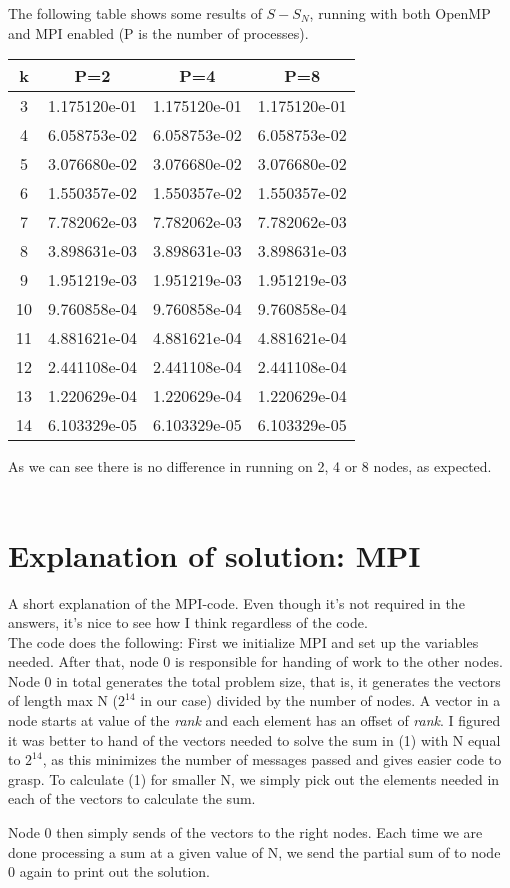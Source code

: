 \documentclass{article}
\begin{document}
The following table shows some results of $S-S_N$, running with both OpenMP and MPI enabled (P is the number of processes). \\
 
\begin{tabular} {| c || c | c | c |}
\hline
k  &  P=2           &  P=4         &   P=8 \\ \hline
3  & 1.175120e-01 & 1.175120e-01   &  1.175120e-01      \\
4  & 6.058753e-02 & 6.058753e-02   &  6.058753e-02      \\
5  & 3.076680e-02 & 3.076680e-02   &  3.076680e-02      \\ 
6  & 1.550357e-02 & 1.550357e-02   &  1.550357e-02      \\
7  & 7.782062e-03 & 7.782062e-03   &  7.782062e-03      \\
8  & 3.898631e-03 & 3.898631e-03   &  3.898631e-03      \\
9  & 1.951219e-03 & 1.951219e-03   &  1.951219e-03      \\
10 & 9.760858e-04 & 9.760858e-04   &  9.760858e-04      \\
11 & 4.881621e-04 & 4.881621e-04   &  4.881621e-04      \\
12 & 2.441108e-04 & 2.441108e-04   &  2.441108e-04      \\
13 & 1.220629e-04 & 1.220629e-04   &  1.220629e-04      \\
14 & 6.103329e-05 & 6.103329e-05   &  6.103329e-05      \\
\hline
\end{tabular}


As we can see there is no difference in running on 2, 4 or 8 nodes, as expected.  \\ \\

\section*{Explanation of solution: MPI}
A short explanation of the MPI-code. Even though it's not required in the answers, it's nice to see how I think regardless of the code. \\
The code does the following: First we initialize MPI and set up the variables needed. After that, node 0 is responsible for handing of work to the other nodes. Node 0 in total generates the total problem size, that is, it generates the vectors of length max N ($2^{14}$ in our case) divided by the number of nodes. A vector in a node starts at value of the \emph{rank} and each element has an offset of \emph{rank}. I figured it was better to hand of the vectors needed to solve the sum in (1) with N equal to $2^{14}$, as this minimizes the number of messages passed and gives easier code to grasp. To calculate (1) for smaller N, we simply pick out the elements needed in each of the vectors to calculate the sum.

Node 0 then simply sends of the vectors to the right nodes. Each time we are done processing a sum at a given value of N, we send the partial sum of to node 0 again to print out the solution. 
\end{document}
